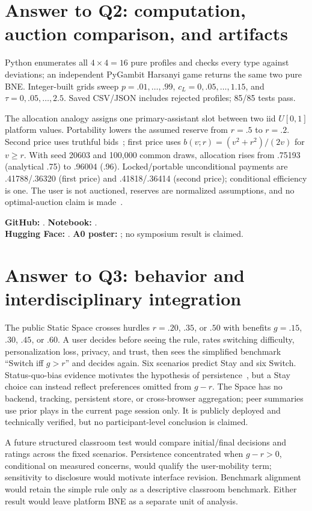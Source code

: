 \section{Answer to Q2: computation, auction comparison, and artifacts}
Python enumerates all $4\times4=16$ pure profiles and checks every type against deviations; an independent PyGambit Harsanyi game returns the same two pure BNE. Integer-built grids sweep $p=.01,\ldots,.99$, $c_L=0,.05,\ldots,1.15$, and $\tau=0,.05,\ldots,2.5$. Saved CSV/JSON includes rejected profiles; 85/85 tests pass.

The allocation analogy assigns one primary-assistant slot between two iid $U[0,1]$ platform values. Portability lowers the assumed reserve from $r=.5$ to $r=.2$. Second price uses truthful bids~\cite{vickrey1961counterspeculation}; first price uses $b(v;r)=(v^2+r^2)/(2v)$ for $v\ge r$. With seed 20603 and 100,000 common draws, allocation rises from .75193 (analytical .75) to .96004 (.96). Locked/portable unconditional payments are .41788/.36320 (first price) and .41818/.36414 (second price); conditional efficiency is one. The user is not auctioned, reserves are normalized assumptions, and no optimal-auction claim is made~\cite{myerson1981optimal}.

\textbf{GitHub:} \GitHubLink. \textbf{Notebook:} \NotebookLink.\\
\textbf{Hugging Face:} \HuggingFaceLink. \textbf{A0 poster:} \PosterLink; no symposium result is claimed.

\clearpage\balance
\section{Answer to Q3: behavior and interdisciplinary integration}
The public Static Space crosses hurdles $r=.20$, $.35$, or $.50$ with benefits $g=.15$, $.30$, $.45$, or $.60$. A user decides before seeing the rule, rates switching difficulty, personalization loss, privacy, and trust, then sees the simplified benchmark ``Switch iff $g>r$'' and decides again. Six scenarios predict Stay and six Switch. Status-quo-bias evidence motivates the hypothesis of persistence~\cite{samuelson1988statusquo}, but a Stay choice can instead reflect preferences omitted from $g-r$. The Space has no backend, tracking, persistent store, or cross-browser aggregation; peer summaries use prior plays in the current page session only. It is publicly deployed and technically verified, but no participant-level conclusion is claimed.

A future structured classroom test would compare initial/final decisions and ratings across the fixed scenarios. Persistence concentrated when $g-r>0$, conditional on measured concerns, would qualify the user-mobility term; sensitivity to disclosure would motivate interface revision. Benchmark alignment would retain the simple rule only as a descriptive classroom benchmark. Either result would leave platform BNE as a separate unit of analysis.

